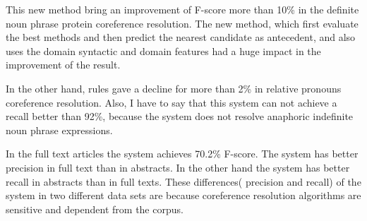 This new method bring an improvement of F-score more than 10\% in the definite noun phrase protein coreference resolution. The new method, which first evaluate the best methods and then predict the nearest candidate as antecedent, and also uses the domain syntactic and domain features had a huge impact in the improvement of the result. 

In the other hand, rules gave a decline for more than 2\% in relative pronouns coreference resolution. Also, I have to say that this system can not achieve a recall better than 92\%, because the system does not resolve anaphoric indefinite noun phrase expressions. 

In the full text articles the system achieves 70.2\% F-score. The system has better precision in full text than in abstracts. In the other hand the system has better recall in abstracts than in full texts. These differences( precision and recall) of the system in two different data sets are because coreference resolution algorithms are sensitive and dependent from the corpus.